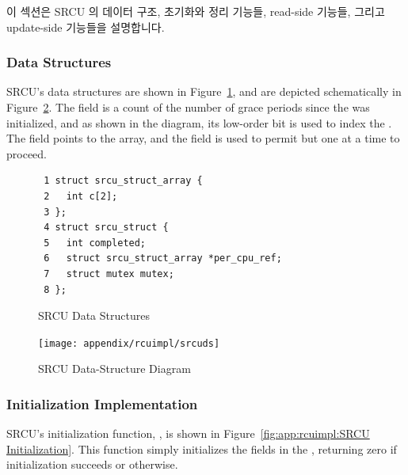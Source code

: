 이 섹션은 SRCU 의 데이터 구조, 초기화와 정리 기능들, read-side 기능들, 그리고
update-side 기능들을 설명합니다.

\subsubsection{Data Structures}
\label{sec:app:rcuimpl:Data Structures}

SRCU's data structures are shown in
Figure~\ref{fig:app:rcuimpl:SRCU Data Structures},
and are depicted schematically in
Figure~\ref{fig:app:whymb:SRCU Data-Structure Diagram}.
The  field is a count of the number of grace periods
since the   was initialized, and as shown in the
diagram, its low-order bit is used to index the
 .
The  field points to the array, and the
 field is used to permit but one  at
a time to proceed.

\begin{figure}[htbp]
{ \scriptsize
\begin{verbatim}
 1 struct srcu_struct_array {
 2   int c[2];
 3 };
 4 struct srcu_struct {
 5   int completed;
 6   struct srcu_struct_array *per_cpu_ref;
 7   struct mutex mutex;
 8 };
\end{verbatim}
}
\caption{SRCU Data Structures}
\label{fig:app:rcuimpl:SRCU Data Structures}
\end{figure}

\begin{figure}[htb]
\centering
\texttt{[image: appendix/rcuimpl/srcuds]}
\caption{SRCU Data-Structure Diagram}
\label{fig:app:whymb:SRCU Data-Structure Diagram}
\end{figure}

\subsubsection{Initialization Implementation}
\label{sec:app:rcuimpl:Initialization Implementation}

SRCU's initialization function, , is shown in
Figure~\ref{fig:app:rcuimpl:SRCU Initialization}.
This function simply initializes the fields in the
 , returning zero if initialization succeeds
or  otherwise.

